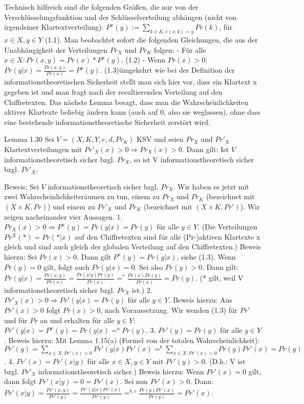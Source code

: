 \documentclass[a4paper]{article}
\begin{document}
\begin{multicols}{3}
    Technisch hilfreich sind die folgenden Größen, die nur von der Verschlüsselungsfunktion und der Schlüsselverteilung abhängen (nicht von irgendeiner Klartextverteilung): $P^x(y):=\sum_{k\in K, e(x,k)=y} Pr(k)$, für $x\in X,y\in Y$ (1.1).
    Man beobachtet sofort die folgenden Gleichungen, die aus der Unabhängigkeit der Verteilungen $Pr_X$ und $Pr_K$ folgen:
    - Für alle $x\in X:Pr(x,y) = Pr(x)*P^x(y)$. (1.2)
    - Wenn $Pr(x)> 0$:$Pr(y|x) = \frac{Pr(x,y)}{Pr(x)}=P^x(y)$. (1.3)ümgekehrt wie bei der Definition der informationstheoretischen Sicherheit stellt man sich hier vor, dass ein Klartext x gegeben ist und man fragt nach der resultierenden Verteilung auf den Chiffretexten.
    Das nächste Lemma besagt, dass man die Wahrscheinlichkeiten aktiver Klartexte beliebig ändern kann (auch auf 0, also sie weglassen), ohne dass eine bestehende informationstheoretische Sicherheit zerstört wird.

    Lemma 1.30 Sei $V=(X,K,Y,e,d,Pr_K)$ KSV und seien $Pr_X$ und $Pr'_X$ Klartextverteilungen mit $Pr'_X(x)>0\Rightarrow Pr_X(x)>0$. Dann gilt: Ist $V$ informationstheoretisch sicher bzgl. $Pr_X$, so ist V informationstheoretisch sicher bzgl. $Pr'_X$.

    Beweis: Sei $V$ informationstheoretisch sicher bzgl. $Pr_X$. Wir haben es jetzt mit zwei Wahrscheinlichkeitsräumen zu tun, einem zu $Pr_X$ und $Pr_K$ (bezeichnet mit $(X\times K,Pr)$) und einem zu $Pr'_X$ und $Pr_K$ (bezeichnet mit $(X\times K,Pr')$).
    Wir zeigen nacheinander vier Aussagen.
    1. $Pr_X(x)> 0 \Rightarrow P^x(y) = Pr(y|x) = Pr(y)$ für alle $y\in Y$. (Die Verteilungen $Pr^X(*)=Pr(*|x)$ auf den Chiffretexten sind für alle (Pr-)aktiven Klartexte x gleich und sind auch gleich der globalen Verteilung auf den Chiffretexten.) Beweis hierzu: Sei $Pr(x)>0$. Dann gilt $P^x(y)=Pr(y|x)$, siehe (1.3). Wenn $Pr(y)=0$ gilt, folgt auch $Pr(y|x)=0$. Sei also $Pr(y)>0$. Dann gilt: $Pr(y|x) =\frac{Pr(x,y)}{Pr(x)}=\frac{Pr(x|y)Pr(y)}{Pr(x)}=^* \frac{Pr(x)Pr(y)}{Pr(x)}= Pr(y)$. (* gilt, weil V informationstheoretisch sicher bzgl. $Pr_X$ ist.)
    2. $Pr'_X(x)> 0 \Rightarrow Pr'(y|x) = Pr(y)$ für alle $y\in Y$. Beweis hierzu: Aus $Pr'(x)>0$ folgt $Pr(x)>0$, nach Voraussetzung. Wir wenden (1.3) für $Pr'$ und für $Pr$ an und erhalten für alle $y\in Y$: $Pr'(y|x)=P^x(y)=Pr(y|x)=^a Pr(y)$.
    3. $Pr'(y)=Pr(y)$ für alle $y\in Y$. Beweis hierzu: Mit Lemma 1.15(a) (Formel von der totalen Wahrscheinlichkeit): $Pr'(y)=\sum_{x\in X: Pr'(x)> 0} Pr'(y|x)Pr'(x)=^b \sum_{x\in X: Pr'(x)> 0} Pr(y)Pr'(x) = Pr(y)$.
    4. $Pr'(x)=Pr'(x|y)$ für alle $x\in X,y\in Y$ mit $Pr'(y)>0$. (D.h.: V ist bzgl. $Pr'_X$ informationstheoretisch sicher.) Beweis hierzu: Wenn $Pr'(x)=0$ gilt, dann folgt $Pr'(x|y)=0=Pr'(x)$. Sei nun $Pr'(x)>0$. Dann: $Pr'(x|y)=\frac{Pr'(x,y)}{Pr'(y)}=\frac{Pr'(y|x)Pr'(x)}{Pr'(y)}=^{b,c} \frac{Pr(y)Pr'(x)}{Pr(y)} = Pr'(x)$.


\end{multicols}
\end{document}
